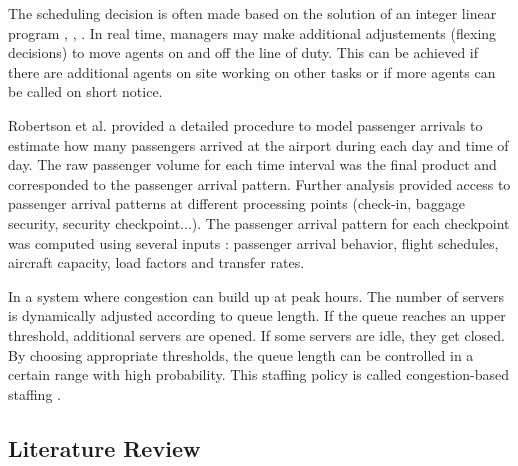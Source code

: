 \documentclass[11pt,onecolumn]{IEEEtran}
\begin{document}
The scheduling decision is often made based on the solution of an integer linear program \cite{dantzig1955linear}, \cite{segal1974operator}, \cite{kolesar1975queuing}.
In real time, managers may make additional adjustements (flexing decisions) to move agents on and off the line of duty. This can be achieved if there are additional agents on site working on other tasks or if more agents can be called on short notice.

Robertson et al. \cite{robertson2002role} provided a detailed procedure to model passenger arrivals to estimate how many passengers arrived at the airport during each day and time of day. The raw passenger volume for each time interval was the final product and corresponded to the passenger arrival pattern. Further analysis provided access to passenger arrival patterns at different processing points (check-in, baggage security, security checkpoint...). The passenger arrival pattern for each checkpoint was computed using several inputs : passenger arrival behavior, flight schedules, aircraft capacity, load factors and transfer rates.

In a system where congestion can build up at peak hours. The number of servers is dynamically adjusted according to queue length. If the queue reaches an upper threshold, additional servers are opened. If some servers are idle, they get closed. By choosing appropriate thresholds, the queue length can be controlled in a certain range with high probability. This staffing policy is called congestion-based staffing \cite{zhang2009performance}.




\subsection{Literature Review}
\end{document}
